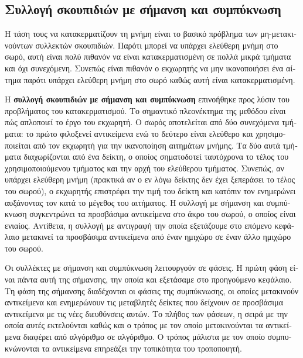 \begin{greek}
\chapter{Συλλογή σκουπιδιών με σήμανση και συμπύκνωση}\label{ch:mrkcmp}
Η τάση τους να κατακερματίζουν τη μνήμη είναι το βασικό πρόβλημα των μη-μετακινούντων 
συλλεκτών σκουπιδιών. Παρότι μπορεί να υπάρχει ελεύθερη μνήμη στο σωρό, αυτή είναι 
πολύ πιθανόν να είναι κατακερματισμένη  σε πολλά μικρά τμήματα και όχι συνεχόμενη. 
Συνεπώς είναι πιθανόν ο εκχωρητής να μην ικανοποιήσει ένα αίτημα παρότι υπάρχει
ελεύθερη μνήμη στο σωρό καθώς αυτή είναι κατακερματισμένη.

Η \textbf{συλλογή σκουπιδιών με σήμανση και συμπύκνωση} επινοήθηκε προς λύσιν του προβλήματος
του κατακερματισμού. Το σημαντικό πλεονέκτημα της μεθόδου είναι πώς απλοποιεί το έργο του εκχωρητή.
Ο σωρός αποτελείται από δύο συνεχόμενα τμήματα: το πρώτο φιλοξενεί αντικείμενα ενώ το δεύτερο 
είναι ελεύθερο και χρησιμοποιείται από τον εκχωρητή για την ικανοποίηση αιτημάτων μνήμης. 
Τα δύο αυτά τμήματα διαχωρίζονται από ένα δείκτη, ο οποίος σηματοδοτεί ταυτόχρονα το 
τέλος του χρησιμοποιούμενου τμήματος και την αρχή του ελεύθερου τμήματος. Συνεπώς, αν 
υπάρχει ελεύθερη μνήμη (πρακτικά αν ο εν λόγω δείκτης δεν έχει ξεπεράσει το τέλος του 
σωρού), ο εκχωρητής επιστρέφει την τιμή του δείκτη και κατόπιν τον ενημερώνει αυξάνοντας
τον κατά το μέγεθος του αιτήματος. Η συλλογή με σήμανση και συμπύκνωση συγκεντρώνει τα 
προσβάσιμα αντικείμενα στο άκρο του σωρού, ο οποίος είναι ενιαίος. Αντίθετα, η συλλογή 
με αντιγραφή  την οποία εξετάζουμε στο επόμενο κεφάλαιο μετακινεί τα προσβάσιμα 
αντικείμενα από έναν ημιχώρο σε έναν άλλο ημιχώρο του σωρού.

Οι συλλέκτες με σήμανση και συμπύκνωση λειτουργούν σε φάσεις. Η πρώτη φάση είναι πάντα 
αυτή της σήμανσης, την οποία και εξετάσαμε στο προηγούμενο κεφάλαιο. Τη φάση της σήμανσης 
διαδέχονται οι φάσεις της συμπύκνωσης, οι οποίες μετακινούν αντικείμενα και ενημερώνουν 
τις μεταβλητές δείκτες που δείχνουν σε προσβάσιμα αντικείμενα με τις νέες διευθύνσεις 
αυτών. Το πλήθος των φάσεων, η σειρά με την οποία αυτές εκτελούνται καθώς και ο τρόπος με 
τον οποίο μετακινούνται τα αντικείμενα διαφέρει από αλγόριθμο σε αλγόριθμο. Ο τρόπος 
μάλιστα με τον οποίο συμπυκνώνονται τα αντικείμενα επηρεάζει την τοπικότητα του 
τροποποιητή.


\end{greek}
